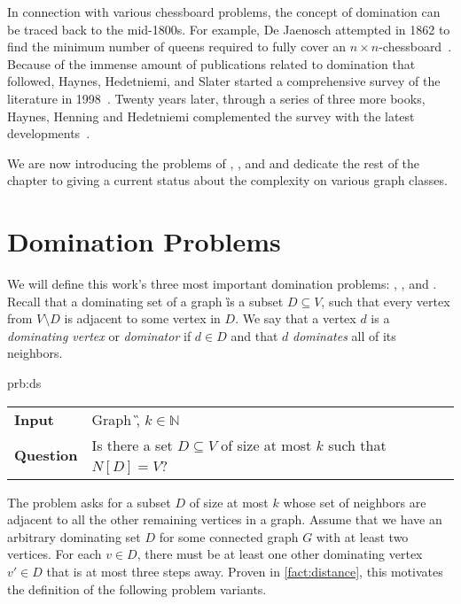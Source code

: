 In connection with various chessboard problems, the concept of domination can be traced back to the mid-1800s.
For example, De Jaenosch attempted in 1862 to find the minimum number of queens required to fully cover an $n \times n$-chessboard~\cite{Jaenisch1862}.
Because of the immense amount of publications related to domination that followed, Haynes, Hedetniemi, and Slater started a comprehensive survey of the literature in 1998~\cite{Haynes1998, Haynes1998b}. 
Twenty years later, through a series of three more books, Haynes, Henning and Hedetniemi complemented the survey with the latest developments~\cite{Haynes2020, Haynes2021, Haynes2022}.

We are now introducing the problems of \dom, \sdom, and \tdom and dedicate the rest of the chapter to giving a current status about the complexity on various graph classes. 

\section{Domination Problems}

We will define this work's three most important domination problems: \dom, \sdom, and \tdom.
Recall that a dominating set of a graph \G is a subset $D \subseteq V$, such that every vertex from $V \setminus D$ is adjacent to some vertex in $D$.
We say that a vertex $d$ is a \textit{dominating vertex} or \textit{dominator} if $d \in D$ and that $d$ \textit{dominates} all of its neighbors.

\begin{prb}{prb:ds}
    \begin{tabularx}{1.0\textwidth}{>{\hsize=0.30\hsize}X>{\hsize=0.8\hsize}X}
        \textbf{Input} & Graph \G, $k \in \mathbb{N}$\\
        \textbf{Question} & Is there a set {$D \subseteq V$} of size at most $k$ such that ${N[D] = V}$? \\
    \end{tabularx}
\end{prb}

The \dom problem asks for a subset $D$ of size at most $k$ whose set of neighbors are adjacent to all the other remaining vertices in a graph.
Assume that we have an arbitrary dominating set $D$ for some connected graph $G$ with at least two vertices.
For each $v \in D$, there must be at least one other dominating vertex $v' \in D$ that is at most three steps away.
Proven in \cref{fact:distance}, this motivates the definition of the following problem variants.

